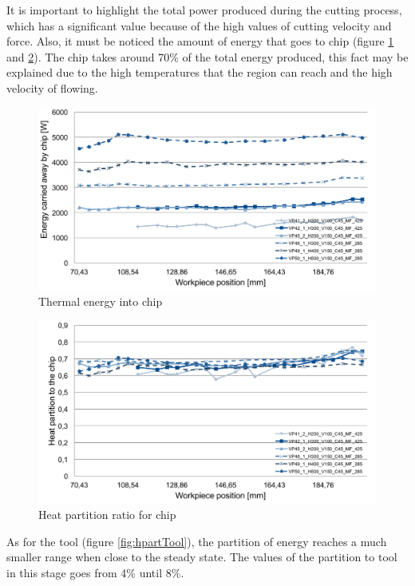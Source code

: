	It is important to highlight the total power produced during the cutting process, which has a significant value because of the high values of cutting velocity and force. Also, it must be noticed the amount of energy that goes to chip (figure \ref{fig:energyChip} and \ref{fig:hpartChip}). The chip takes around 70\% of the total energy produced, this fact may be explained due to the high temperatures that the region can reach and the high velocity of flowing.

	\begin{figure}[H]
		\centering
		\captionsetup{justification=centering}
		\includegraphics[scale=0.55]{Imagens/energyChip.png}
		\caption{Thermal energy into chip}
		\label{fig:energyChip}
	\end{figure}

	\begin{figure}[H]
		\centering
		\captionsetup{justification=centering}
		\includegraphics[scale=0.55]{Imagens/PartChip.png}
		\caption{Heat partition ratio for chip}
		\label{fig:hpartChip}
	\end{figure}

	As for the tool (figure \ref{fig:hpartTool}), the partition of energy reaches a much smaller range when close to the steady state. The values of the partition to tool in this stage goes from 4\% until 8\%.

